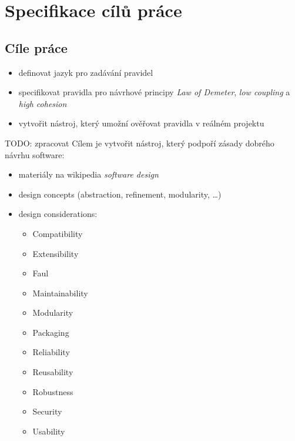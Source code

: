 \chapter{Specifikace cílů práce}



\section{Cíle práce}
\begin{itemize}
\item definovat jazyk pro zadávání pravidel
\item specifikovat pravidla pro návrhové principy \emph{Law of Demeter}, \emph{low coupling} a \emph{high cohesion}
\item vytvořit nástroj, který umožní ověřovat pravidla v reálném projektu
\end{itemize}

TODO: zpracovat
Cílem je vytvořit nástroj, který podpoří zásady dobrého návrhu software:
\begin{itemize}
\item materiály na wikipedia \emph{software design}
\item design concepts (abstraction, refinement, modularity, \ldots)
\item design considerations:
  \begin{itemize}
  \item Compatibility
  \item Extensibility
  \item Faul
  \item Maintainability
  \item Modularity
  \item Packaging
  \item Reliability
  \item Reusability
  \item Robustness
  \item Security
  \item Usability
  \end{itemize}
\end{itemize}

